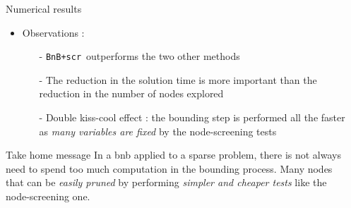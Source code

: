 \documentclass[final]{beamer}
\newlength{\sepwid}
\newlength{\onecolwid}
\newcommand{\emphone}[1]{\textit{\color{norange}#1}}
\newcommand{\BNBscr}{\texttt{BnB+scr}}
\begin{document}
\begin{frame}[t]
\begin{columns}[t]
\begin{column}{\onecolwid}
\begin{block}{Numerical results}
        \begin{itemize}
            \item \hspace{0.1in} Observations :
            \begin{itemize}
                \normalsize \item[-] \hspace*{0.1in}\BNBscr~outperforms the two other methods
                \item[-] \hspace*{0.1in} The reduction in the solution time is more important than the reduction in the number of nodes explored
                \item[-] \hspace*{0.1in} Double kiss-cool effect : the bounding step is performed all the faster as \emphone{many variables are fixed} by the node-screening tests
            \end{itemize}
        \end{itemize}
        \begin{alertblock}{Take home message}
            In a \gls{bnb} applied to a sparse problem, there is not always need to spend too much computation in the bounding process.
            Many nodes that can be \emphone{easily pruned} by performing \emphone{simpler and cheaper tests} like the node-screening one.
        \end{alertblock}
    \end{block}
\end{column} 

\begin{column}{\sepwid}\end{column}

\end{columns}
\end{frame}
\end{document}
